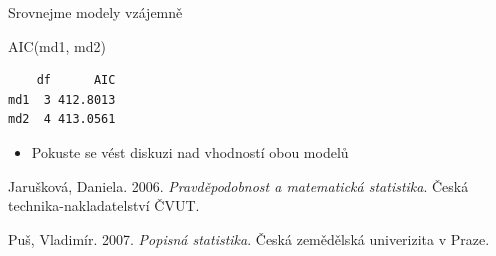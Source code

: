 \documentclass[
  letterpaper,
  DIV=11,
  numbers=noendperiod]{scrreprt}
\newenvironment{Shaded}{\begin{snugshade}}{\end{snugshade}}
\newcommand{\FunctionTok}[1]{\textcolor[rgb]{0.28,0.35,0.67}{#1}}
\newcommand{\NormalTok}[1]{\textcolor[rgb]{0.00,0.23,0.31}{#1}}
\providecommand{\tightlist}{%
  \setlength{\itemsep}{0pt}\setlength{\parskip}{0pt}}\usepackage{longtable,booktabs,array}
\newlength{\cslhangindent}
\newlength{\cslentryspacingunit} %
\newenvironment{CSLReferences}[2] %
 {%
  \setlength{\parindent}{0pt}
  \ifodd #1
  \let\oldpar\par
  \def\par{\hangindent=\cslhangindent\oldpar}
  \fi
  \setlength{\parskip}{#2\cslentryspacingunit}
 }%
 {}
\begin{document}
Srovnejme modely vzájemně

\begin{Shaded}
\begin{Highlighting}[]
\FunctionTok{AIC}\NormalTok{(md1, md2)}
\end{Highlighting}
\end{Shaded}

\begin{verbatim}
    df      AIC
md1  3 412.8013
md2  4 413.0561
\end{verbatim}

\begin{itemize}
\tightlist
\item
  Pokuste se vést diskuzi nad vhodností obou modelů
\end{itemize}

\hypertarget{refs}{}
\begin{CSLReferences}{1}{0}
\leavevmode{}%
Jarušková, Daniela. 2006. \emph{Pravděpodobnost a matematická
statistika}. Česká technika-nakladatelství ČVUT.

\leavevmode{}%
Puš, Vladimír. 2007. \emph{Popisná statistika}. Česká zemědělská
univerizita v Praze.

\end{CSLReferences}
\end{document}
